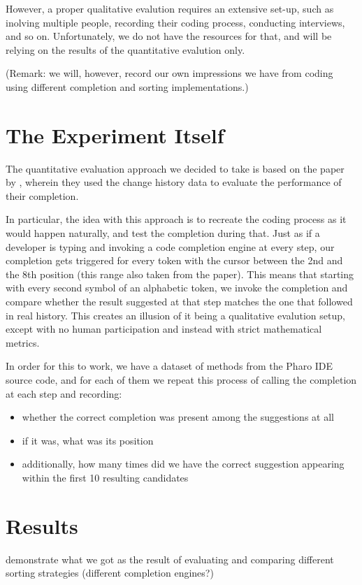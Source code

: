 However, a proper qualitative evalution requires an extensive set-up, such as inolving multiple people, recording their coding process, conducting interviews, and so on. Unfortunately, we do not have the resources for that, and will be relying on the results of the quantitative evalution only.

(Remark: we will, however, record our own impressions we have from coding using different completion and sorting implementations.)

\section{The Experiment Itself}
\label{sec:Evaluation-Experiment}
The quantitative evaluation approach we decided to take is based on the paper by \cite{Robb08a}, wherein they used the change history data to evaluate the performance of their completion.

In particular, the idea with this approach is to recreate the coding process as it would happen naturally, and test the completion during that. Just as if a developer is typing and invoking a code completion engine at every step, our completion gets triggered for every token with the cursor between the 2nd and the 8th position (this range also taken from the \cite{Robb08a} paper). This means that starting with every second symbol of an alphabetic token, we invoke the completion and compare whether the result suggested at that step matches the one that followed in real history. This creates an illusion of it being a qualitative evalution setup, except with no human participation and instead with strict mathematical metrics.

In order for this to work, we have a dataset of methods from the Pharo IDE source code, and for each of them we repeat this process of calling the completion at each step and recording:
\begin{itemize}
    \item whether the correct completion was present among the suggestions at all
    \item if it was, what was its position
    \item additionally, how many times did we have the correct suggestion appearing within the first 10 resulting candidates
\end{itemize}

\section{Results}
\label{sec:Evaluation-Results}
demonstrate what we got as the result of evaluating and comparing different sorting strategies (different completion engines?)